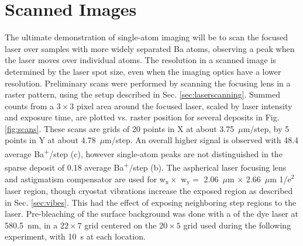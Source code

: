 
\section{Scanned Images}
\label{sec:scanning}

The ultimate demonstration of single-atom imaging will be to scan the focused laser over samples with more widely	 separated Ba atoms, observing a peak when the laser moves over individual atoms.  The resolution in a scanned image is determined by the laser spot size, even when the imaging optics have a lower resolution.  Preliminary scans were performed by scanning the focusing lens in a raster pattern, using the setup described in Sec. \ref{sec:laserscanning}.  Summed counts from a $3 \times 3$ pixel area around the focused laser, scaled by laser intensity and exposure time, are plotted vs. raster position for several deposits in Fig. \ref{fig:scans}.  These scans are grids of 20 points in X at about 3.75~$\mu$m/step, by 5 points in Y at about 4.78~$\mu$m/step.  An overall higher signal is observed with 48.4 average Ba\textsuperscript{+}/step (c), however single-atom peaks are not distinguished in the sparse deposit of 0.18 average Ba\textsuperscript{+}/step (b).  The aspherical laser focusing lens and astigmatism compensator are used for w$_{\text{x}} \times$ w$_{\text{y}} =$ 2.06~$\mu$m $\times$ 2.66~$\mu$m 1/e$^{2}$ laser region, though cryostat vibrations increase the exposed region as described in Sec. \ref{sec:vibes}.  This had the effect of exposing neighboring step regions to the laser.  Pre-bleaching of the surface background was done with a  of the dye laser at 580.5~nm, in a $22 \times 7$ grid centered on the $20 \times 5$ grid used during the following experiment, with 10~s at each location.

